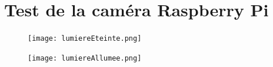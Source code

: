\documentclass[12pt]{beamer}
\begin{document}
	\section{Test de la caméra Raspberry Pi}
	\begin{frame}[allowframebreaks]
        \begin{figure}
            \centering
            \texttt{[image: lumiereEteinte.png]}
        \end{figure}
        
        \begin{figure}
            \centering
            \texttt{[image: lumiereAllumee.png]}
        \end{figure}	
	\end{frame}
\end{document}

